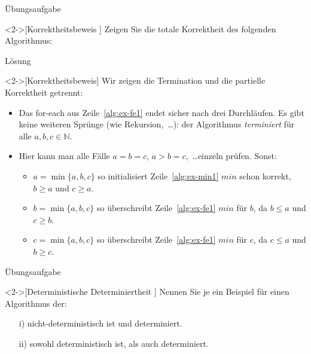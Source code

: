 \begin{frame}[c]{Übungsaufgabe}
    \begin{exercise}<2->[Korrektheitsbeweis ]
        Zeigen Sie die totale Korrektheit des folgenden Algorithmus:\smallskip\par
{}
    \end{exercise}
\end{frame}

\begin{frame}[c]{Lösung}
    \begin{solve}<2->[Korrektheitsbeweis]
       \pause{}Wir zeigen die Termination und die partielle Korrektheit getrennt: \begin{itemize}[<+(1)->]
           \item Das for-each aus Zeile~\ref{alg:ex-fe1} endet sicher nach drei Durchläufen. Es gibt keine weiteren Sprünge (wie Rekursion,~\ldots): der Algorithmus \emph{terminiert} für alle \(a, b, c \in \mathbb{N}\).
           \item Hier kann man alle Fälle \(a = b = c\), \(a > b = c\),~\ldots einzeln prüfen. Sonst: \begin{itemize}
             \item \(a = \min\{a, b, c\}\) so initialisiert Zeile~\ref{alg:ex-min1} \(min\) schon korrekt, \(b \geq a\) und \(c \geq a\).
             \item \(b = \min\{a, b, c\}\) so überschreibt Zeile~\ref{alg:ex-fe1} \(min\) für \(b\), da \(b \leq a\) und \(c \geq b\).
             \item \(c = \min\{a, b, c\}\) so überschreibt Zeile~\ref{alg:ex-fe1} \(min\) für \(c\), da \(c \leq a\) und \(b \geq c\).
           \end{itemize}
       \end{itemize}
    \end{solve}
\end{frame}

\begin{frame}[c]{Übungsaufgabe}
    \begin{exercise}<2->[Deterministische Determiniertheit ]
        \pause{}Nennen Sie je ein Beispiel für einen Algorithmus der:
        \begin{enumerate}[<+(1)->]
            \item[i)] nicht-deterministisch ist und determiniert.
            \item[ii)] sowohl deterministisch ist, als auch determiniert.
        \end{enumerate}
    \end{exercise}
\end{frame}

